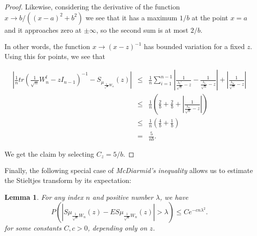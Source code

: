 \documentclass[12pt,a4paper,leqno]{report}
\theoremstyle{plain}
\newtheorem{lem}[equation]{Lemma}
\theoremstyle{definition}
\theoremstyle{remark}
\begin{document}
\begin{proof}
Likewise, considering the derivative of the function $x \to b/((x-a)^2+b^2)$ we see that it has a maximum $1/b$ at the point $x=a$ and it approaches zero at $\pm \infty$, so the second sum is at most $2/b$.

In other words, the function $x \to (x-z)^{-1}$ has bounded variation for a fixed $z$. Using this for points, we see that  

\begin{eqnarray*}
\left|\frac{1}{n}tr(\frac{1}{\sqrt{n}}W_n^l-zI_{n-1})^{-1} - S_{\mu_{\frac{1}{\sqrt{n}}W_n}}(z)\right| 
& \leq & \frac{1}{n}
\sum_{i=1}^{n-1} \left|\frac{1}{\frac{\lambda_i'}{\sqrt{n}}-z} - \frac{1}{\frac{\lambda_i}{\sqrt{n}}-z}\right| + \left|\frac{1}{\frac{\lambda_n}{\sqrt{n}}-z}\right|\\
& \leq & \frac{1}{n} \left(\frac{2}{b} + \frac{2}{b}  + \left|\frac{1}{\frac{\lambda_n}{\sqrt{n}}-z}\right|\right)\\
& \leq &  \frac{1}{n} \left( \frac{4}{b} + \frac{1}{b} \right)\\
& = & \frac{5}{nb}.
\end{eqnarray*}

We get the claim by selecting $C_z = 5/b$.
\end{proof}

Finally, the following special case of \emph{McDiarmid's inequality} allows us to estimate the Stieltjes transform by its expectation:

\begin{lem}
For any index $n$ and positive number $\lambda$, we have
\begin{equation*}
P(|S\mu_{\frac{1}{\sqrt{n}}W_n}(z)- ES\mu_{\frac{1}{\sqrt{n}}W_n}(z)|>\lambda) \leq Ce^{-cn\lambda^2}.
\end{equation*}
for some constants $C, c > 0$, depending only on $z$.
\end{lem}
\end{document}

